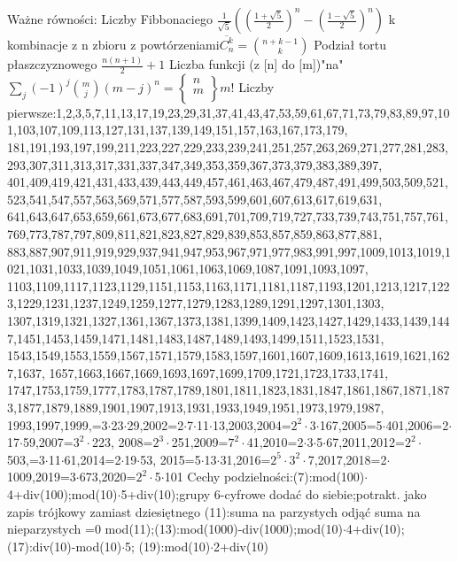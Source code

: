 \documentclass{article}
\newcommand{\stirlingb}[2]{\left\{\begin{array}{c}{#1}\\{#2}\\\end{array}\right\}}
\begin{document}
{Ważne równości:\newline
Liczby Fibbonaciego $\frac{1}{\sqrt{5}}((\frac{1+\sqrt{5}}{2})^n-(\frac{1-\sqrt{5}}{2})^n)$\quad
k kombinacje z n zbioru z powtórzeniami$\overline{C^k_n}={n+k-1\choose k}$\quad
Podział tortu płaszczyznowego $\frac{n(n+1)}{2}+1$\newline
Liczba funkcji (z [n] do [m])"na" $\sum_j(-1)^j{m\choose j}(m-j)^n=\stirlingb{n}{m}m!$\newline
Liczby pierwsze:1,2,3,5,7,11,13,17,19,23,29,31,37,41,43,47,53,59,61,67,71,73,79,83,89,97,101,103,107,109,113,127,131,137,139,149,151,157,163,167,173,179,
181,191,193,197,199,211,223,227,229,233,239,241,251,257,263,269,271,277,281,283,293,307,311,313,317,331,337,347,349,353,359,367,373,379,383,389,397,
401,409,419,421,431,433,439,443,449,457,461,463,467,479,487,491,499,503,509,521,523,541,547,557,563,569,571,577,587,593,599,601,607,613,617,619,631,
641,643,647,653,659,661,673,677,683,691,701,709,719,727,733,739,743,751,757,761,769,773,787,797,809,811,821,823,827,829,839,853,857,859,863,877,881,
883,887,907,911,919,929,937,941,947,953,967,971,977,983,991,997,1009,1013,1019,1021,1031,1033,1039,1049,1051,1061,1063,1069,1087,1091,1093,1097,
1103,1109,1117,1123,1129,1151,1153,1163,1171,1181,1187,1193,1201,1213,1217,1223,1229,1231,1237,1249,1259,1277,1279,1283,1289,1291,1297,1301,1303,
1307,1319,1321,1327,1361,1367,1373,1381,1399,1409,1423,1427,1429,1433,1439,1447,1451,1453,1459,1471,1481,1483,1487,1489,1493,1499,1511,1523,1531,
1543,1549,1553,1559,1567,1571,1579,1583,1597,1601,1607,1609,1613,1619,1621,1627,1637,	1657,1663,1667,1669,1693,1697,1699,1709,1721,1723,1733,1741,
1747,1753,1759,1777,1783,1787,1789,1801,1811,1823,1831,1847,1861,1867,1871,1873,1877,1879,1889,1901,1907,1913,1931,1933,1949,1951,1973,1979,1987,
1993,1997,1999,=3$\cdot$23$\cdot$29,2002=2$\cdot$7$\cdot$11$\cdot$13,2003,2004=$2^2\cdot$3$\cdot$167,2005=5$\cdot$401,2006=2$\cdot$17$\cdot$59,2007=$3^2\cdot$223,
2008=$2^3\cdot$251,2009=$7^2\cdot$41,2010=2$\cdot$3$\cdot$5$\cdot$67,2011,2012=$2^2\cdot$503,=3$\cdot$11$\cdot$61,2014=2$\cdot$19$\cdot$53,
2015=5$\cdot$13$\cdot$31,2016=$2^5\cdot3^2\cdot$7,2017,2018=2$\cdot$1009,2019=3$\cdot$673,2020=$2^2\cdot$5$\cdot$101\newline\newline
Cechy podzielności:(7):mod(100)$\cdot$4+div(100);mod(10)$\cdot$5+div(10);grupy 6-cyfrowe dodać do siebie;potrakt. jako zapis trójkowy zamiast dziesiętnego
(11):suma na parzystych odjąć suma na nieparzystych =0 mod(11);(13):mod(1000)-div(1000);mod(10)$\cdot$4+div(10);(17):div(10)-mod(10)$\cdot$5;\newline
(19):mod(10)$\cdot$2+div(10)
}
\end{document}
